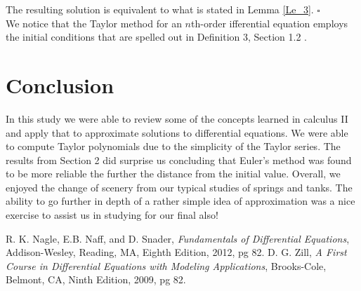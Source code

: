 \documentclass[12pt, letterpaper]{article}  %
\begin{document}
The resulting solution is equivalent to what is stated in Lemma \ref{Le_3}. $\square$ \\
We notice that the Taylor method for an $n$th-order ifferential equation employs the initial conditions
that are spelled out in Definition 3, Section 1.2 \cite{NagleNaffSnader}.

\section*{Conclusion}
In this study we were able to review some of the concepts learned in calculus II and apply that to approximate solutions to differential equations.
We were able to compute Taylor polynomials due to the simplicity of the Taylor series.  The results from Section 2 did surprise us concluding that
Euler's method was found to be more reliable the further the distance from the initial value.  Overall, we enjoyed the change of scenery from our typical studies of springs and tanks.  
The ability to go further in depth of a rather simple idea of approximation was a nice exercise to assist us in studying for our final also!


\cleardoublepage 
\begin{thebibliography}{99}
 R. K. Nagle, E.B. Naff, and D. Snader, \emph{Fundamentals of Differential Equations}, Addison-Wesley, Reading, MA, Eighth Edition,  2012, pg 82.
D. G. Zill, \emph{A First Course in  Differential Equations with Modeling Applications}, Brooks-Cole, Belmont, CA, Ninth Edition,  2009, pg 82.
\end{thebibliography}
\end{document}
